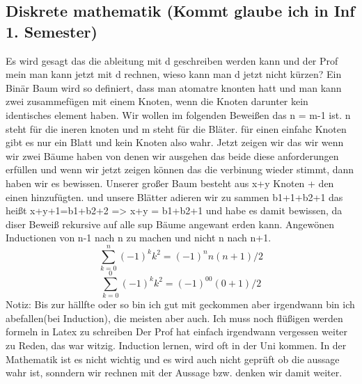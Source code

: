 \documentclass{article}
\begin{document}
\subsection{Diskrete mathematik (Kommt glaube ich in Inf 1. Semester)}
Es wird gesagt das die ableitung mit d geschreiben werden kann und der Prof mein man kann jetzt mit d rechnen, wieso kann man d jetzt nicht kürzen?
Ein Binär Baum wird so definiert, dass man atomatre knonten hatt und man kann zwei zusammefügen mit einem Knoten, wenn die Knoten darunter kein identisches element haben.
Wir wollen im folgenden Beweißen das n = m-1 ist. n steht für die ineren knoten und m steht für die Bläter. für einen einfahc Knoten gibt es nur ein Blatt und kein Knoten also wahr.
Jetzt zeigen wir das wir wenn wir zwei Bäume haben von denen wir ausgehen das beide diese anforderungen erfüllen und wenn wir jetzt zeigen können das die verbinung wieder stimmt,
dann haben wir es bewissen. Unserer großer Baum besteht aus x+y Knoten + den einen hinzufügten. und unsere Blätter adieren wir zu sammen b1+1+b2+1 das heißt x+y+1=b1+b2+2 => x+y = b1+b2+1
und habe es damit bewissen, da diser Beweiß rekursive auf alle sup Bäume angewant erden kann. Angewönen Inductionen von n-1 nach n zu machen und nicht n nach n+1.
\[
  \sum_{k=0}^{n}(-1)^kk^2 = (-1)^nn(n+1)/2
\]
\[
  \sum_{k=0}^{0}(-1)^kk^2 = (-1)^00(0+1)/2
\]
Notiz: Bis zur hällfte oder so bin ich gut mit geckommen aber irgendwann bin ich abefallen(bei Induction), die meisten aber auch.
Ich muss noch flüßigen werden formeln in Latex zu schreiben \break
Der Prof hat einfach irgendwann vergessen weiter zu Reden, das war witzig. \break
Induction lernen, wird oft in der Uni kommen. \break
In der Mathematik ist es nicht wichtig und es wird auch nicht geprüft ob die aussage wahr ist, sonndern wir rechnen mit der Aussage bzw. denken wir damit weiter.
\end{document}
